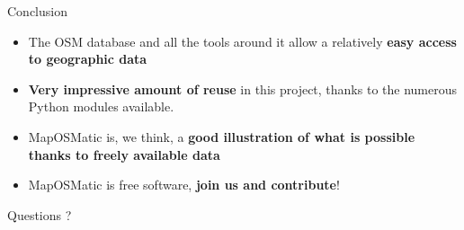 \documentclass{beamer}
\begin{document}
\begin{frame}{Conclusion}
  \begin{itemize}
  \item The OSM database and all the tools around it allow a
    relatively {\bf easy access to geographic data}
  \item {\bf Very impressive amount of reuse} in this project, thanks to the
    numerous Python modules available.
  \item MapOSMatic is, we think, a {\bf good illustration of what is
    possible thanks to freely available data}
  \item MapOSMatic is free software, {\bf join us and contribute}!
  \end{itemize}
\end{frame}

\begin{frame}
  \begin{center}
    \Huge
    Questions ?\\
    \Large
    \vspace{2cm}
    \\
    \vspace{2cm}
    \normalsize
    \\
    \\
  \end{center}
\end{frame}
\end{document}
